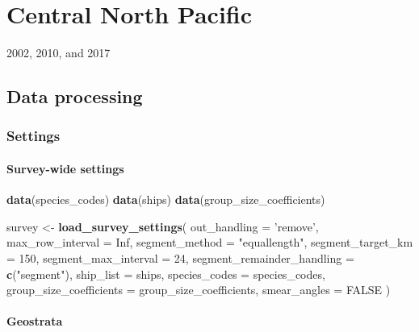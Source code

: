 \documentclass[
]{book}
\newenvironment{Shaded}{\begin{snugshade}}{\end{snugshade}}
\newcommand{\DataTypeTok}[1]{\textcolor[rgb]{0.13,0.29,0.53}{#1}}
\newcommand{\DecValTok}[1]{\textcolor[rgb]{0.00,0.00,0.81}{#1}}
\newcommand{\KeywordTok}[1]{\textcolor[rgb]{0.13,0.29,0.53}{\textbf{#1}}}
\newcommand{\NormalTok}[1]{#1}
\newcommand{\OtherTok}[1]{\textcolor[rgb]{0.56,0.35,0.01}{#1}}
\newcommand{\StringTok}[1]{\textcolor[rgb]{0.31,0.60,0.02}{#1}}
\begin{document}
\hypertarget{case_cnp}{%
\chapter{Central North Pacific}\label{case_cnp}}

2002, 2010, and 2017

\hypertarget{data-processing-1}{%
\section*{Data processing}\label{data-processing-1}}

\hypertarget{settings-2}{%
\subsection*{Settings}\label{settings-2}}

\hypertarget{survey-wide-settings-3}{%
\subsubsection*{Survey-wide settings}\label{survey-wide-settings-3}}

\begin{Shaded}
\begin{Highlighting}[]
\KeywordTok{data}\NormalTok{(species_codes)}
\KeywordTok{data}\NormalTok{(ships)}
\KeywordTok{data}\NormalTok{(group_size_coefficients)}

\NormalTok{survey <-}\StringTok{ }\KeywordTok{load_survey_settings}\NormalTok{(}
  \DataTypeTok{out_handling =} \StringTok{'remove'}\NormalTok{,}
  \DataTypeTok{max_row_interval =} \OtherTok{Inf}\NormalTok{,}
  \DataTypeTok{segment_method =} \StringTok{"equallength"}\NormalTok{,}
  \DataTypeTok{segment_target_km =} \DecValTok{150}\NormalTok{,}
  \DataTypeTok{segment_max_interval =} \DecValTok{24}\NormalTok{,}
  \DataTypeTok{segment_remainder_handling =} \KeywordTok{c}\NormalTok{(}\StringTok{"segment"}\NormalTok{),}
  \DataTypeTok{ship_list =}\NormalTok{ ships,}
  \DataTypeTok{species_codes =}\NormalTok{ species_codes,}
  \DataTypeTok{group_size_coefficients =}\NormalTok{ group_size_coefficients,}
  \DataTypeTok{smear_angles =} \OtherTok{FALSE}
\NormalTok{)}
\end{Highlighting}
\end{Shaded}

\hypertarget{geostrata-2}{%
\subsubsection*{Geostrata}\label{geostrata-2}}
\end{document}
